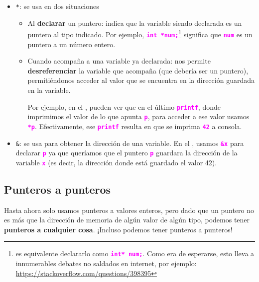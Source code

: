 \documentclass[]{scrartcl}
\newcommand{\hl}[1]{\textcolor{magenta}{\textbf{\texttt{#1}}}}
\begin{document}
\begin{itemize}
  \item \texttt{*}: se usa en dos situaciones
  \begin{itemize}
    \item Al \textbf{declarar} un puntero: indica que la variable siendo declarada es un puntero al tipo indicado.
    Por ejemplo, \hl{int *num;}\footnote{es equivalente declararlo como \hl{int* num;}. Como era de esperarse, esto lleva a innumerables debates no saldados en internet, por ejemplo: \url{https://stackoverflow.com/questions/398395}} significa que \hl{num} es un puntero a un número entero.
    \item Cuando acompaña a una variable ya declarada: nos permite \textbf{desreferenciar} la variable que acompaña (que debería ser un puntero), permitiéndonos acceder al valor que se encuentra en la dirección guardada en la variable.
    
    Por ejemplo, en el , pueden ver que en el último \hl{printf}, donde imprimimos el valor de lo que apunta \hl{p}, para acceder a ese valor usamos \hl{*p}. 
    Efectivamente, ese \hl{printf} resulta en que se imprima \hl{42} a consola.
  \end{itemize}
  \item \texttt{\&}: se usa para obtener la dirección de una variable.
  En el , usamos \hl{\&x} para declarar \hl{p} ya que queríamos que el puntero \hl{p} guardara la dirección de la variable \hl{x} (es decir, la dirección donde está guardado el valor 42). 
\end{itemize}

\subsection*{Punteros a punteros}

Hasta ahora solo usamos punteros a valores enteros, pero dado que un puntero no es más que la dirección de memoria de algún valor de algún tipo, podemos tener \textbf{punteros a cualquier cosa}.
¡Incluso podemos tener punteros a punteros!
\end{document}
